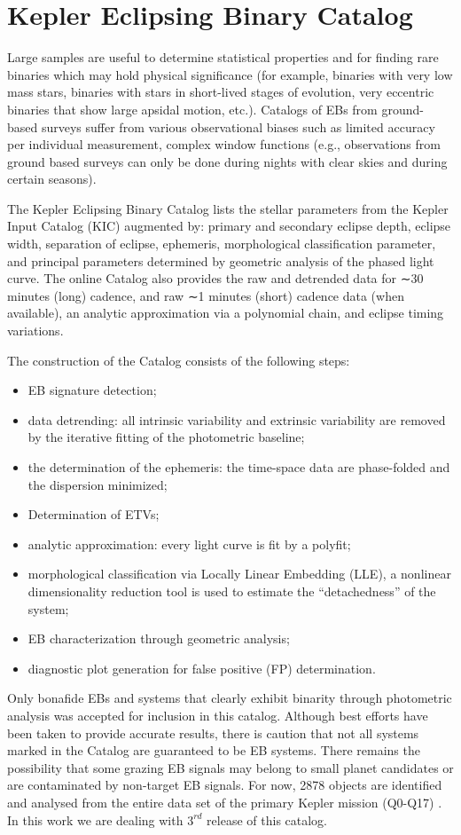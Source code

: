 \section{Kepler Eclipsing Binary Catalog}

Large samples are useful to determine statistical properties
and for finding rare binaries which may hold physical significance (for example, binaries with very low mass stars,
binaries with stars in short-lived stages of evolution, very eccentric binaries that show large apsidal motion, etc.).
Catalogs of EBs from ground-based surveys suffer from various observational biases such as limited accuracy per
individual measurement, complex window functions (e.g., observations from ground based surveys can only be done
during nights with clear skies and during certain seasons).

The Kepler Eclipsing Binary Catalog lists the stellar parameters from the Kepler Input Catalog (KIC) augmented
by: primary and secondary eclipse depth, eclipse width, separation of eclipse, ephemeris, morphological classification
parameter, and principal parameters determined by geometric analysis of the phased light curve.
The online Catalog also provides the raw and detrended data for ∼30 minutes (long) cadence, and raw ∼1 minutes (short)
cadence data (when available), an analytic approximation via a polynomial chain, and eclipse timing variations. 

The construction of the Catalog consists of the following steps: 
\begin{itemize}[noitemsep]
\item EB signature detection; 
\item data detrending: all intrinsic variability and extrinsic variability are removed by the iterative 
fitting of the photometric baseline; 
\item the determination of the ephemeris: the time-space data are phase-folded and the dispersion minimized; 
\item Determination of ETVs;
\item analytic approximation: every light curve is fit by a polyfit; 
\item morphological classification via Locally Linear Embedding (LLE), a nonlinear dimensionality 
reduction tool is used to estimate the “detachedness” of the system;
\item EB characterization through geometric analysis;
\item diagnostic plot generation for false positive (FP) determination.
\end{itemize}


Only bonafide EBs and systems that clearly exhibit binarity through photometric analysis was accepted for inclusion in this catalog. 
Although best efforts have been taken to provide accurate results, there is caution that not all systems marked in the
Catalog are guaranteed to be EB systems. There remains the possibility that some grazing EB signals may belong to small
planet candidates or are contaminated by non-target EB signals. For now, 2878 objects are identified and analysed from the entire data set
of the primary Kepler mission (Q0-Q17) \citep{kirk2016}. In this work we are dealing with $3^{rd}$ release of this catalog.